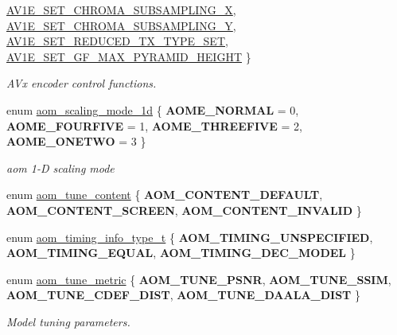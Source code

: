 \begin{DoxyCompactItemize}
\hyperlink{group__aom__encoder_ggae78dde67a6d78f332e9bdba0dde42db5a283dd3f4387e5f3a754fea0d206b1cb0}{A\+V1\+E\+\_\+\+S\+E\+T\+\_\+\+C\+H\+R\+O\+M\+A\+\_\+\+S\+U\+B\+S\+A\+M\+P\+L\+I\+N\+G\+\_\+X}, 
\hyperlink{group__aom__encoder_ggae78dde67a6d78f332e9bdba0dde42db5a501a9453d5790f32c001e9877d3db40c}{A\+V1\+E\+\_\+\+S\+E\+T\+\_\+\+C\+H\+R\+O\+M\+A\+\_\+\+S\+U\+B\+S\+A\+M\+P\+L\+I\+N\+G\+\_\+Y}, 
\hyperlink{group__aom__encoder_ggae78dde67a6d78f332e9bdba0dde42db5abc82eae151e4a5050dbc324b5d16be2d}{A\+V1\+E\+\_\+\+S\+E\+T\+\_\+\+R\+E\+D\+U\+C\+E\+D\+\_\+\+T\+X\+\_\+\+T\+Y\+P\+E\+\_\+\+S\+ET}, 
\hyperlink{group__aom__encoder_ggae78dde67a6d78f332e9bdba0dde42db5a685f831a5a5d08f9b5a14209d55ac129}{A\+V1\+E\+\_\+\+S\+E\+T\+\_\+\+G\+F\+\_\+\+M\+A\+X\+\_\+\+P\+Y\+R\+A\+M\+I\+D\+\_\+\+H\+E\+I\+G\+HT}
 \}\begin{DoxyCompactList}\small\item\em A\+Vx encoder control functions. \end{DoxyCompactList}
\item 
enum \hyperlink{group__aom__encoder_ga2a1791d26fca39303154f0f9ece3e295}{aom\+\_\+scaling\+\_\+mode\+\_\+1d} \{ {\bfseries A\+O\+M\+E\+\_\+\+N\+O\+R\+M\+AL} = 0, 
{\bfseries A\+O\+M\+E\+\_\+\+F\+O\+U\+R\+F\+I\+VE} = 1, 
{\bfseries A\+O\+M\+E\+\_\+\+T\+H\+R\+E\+E\+F\+I\+VE} = 2, 
{\bfseries A\+O\+M\+E\+\_\+\+O\+N\+E\+T\+WO} = 3
 \}\begin{DoxyCompactList}\small\item\em aom 1-\/D scaling mode \end{DoxyCompactList}
\item 
enum \hyperlink{group__aom__encoder_ga801f5eb2cb93da19a2f347ae7a44166a}{aom\+\_\+tune\+\_\+content} \{ {\bfseries A\+O\+M\+\_\+\+C\+O\+N\+T\+E\+N\+T\+\_\+\+D\+E\+F\+A\+U\+LT}, 
{\bfseries A\+O\+M\+\_\+\+C\+O\+N\+T\+E\+N\+T\+\_\+\+S\+C\+R\+E\+EN}, 
{\bfseries A\+O\+M\+\_\+\+C\+O\+N\+T\+E\+N\+T\+\_\+\+I\+N\+V\+A\+L\+ID}
 \}
\item 
enum \hyperlink{group__aom__encoder_gad69c1d6aa10530991eeb1a3f0a818cba}{aom\+\_\+timing\+\_\+info\+\_\+type\+\_\+t} \{ {\bfseries A\+O\+M\+\_\+\+T\+I\+M\+I\+N\+G\+\_\+\+U\+N\+S\+P\+E\+C\+I\+F\+I\+ED}, 
{\bfseries A\+O\+M\+\_\+\+T\+I\+M\+I\+N\+G\+\_\+\+E\+Q\+U\+AL}, 
{\bfseries A\+O\+M\+\_\+\+T\+I\+M\+I\+N\+G\+\_\+\+D\+E\+C\+\_\+\+M\+O\+D\+EL}
 \}
\item 
enum \hyperlink{group__aom__encoder_gaafd352cc596fab5388558950f8bbe739}{aom\+\_\+tune\+\_\+metric} \{ {\bfseries A\+O\+M\+\_\+\+T\+U\+N\+E\+\_\+\+P\+S\+NR}, 
{\bfseries A\+O\+M\+\_\+\+T\+U\+N\+E\+\_\+\+S\+S\+IM}, 
{\bfseries A\+O\+M\+\_\+\+T\+U\+N\+E\+\_\+\+C\+D\+E\+F\+\_\+\+D\+I\+ST}, 
{\bfseries A\+O\+M\+\_\+\+T\+U\+N\+E\+\_\+\+D\+A\+A\+L\+A\+\_\+\+D\+I\+ST}
 \}\begin{DoxyCompactList}\small\item\em Model tuning parameters. \end{DoxyCompactList}
\end{DoxyCompactItemize}

